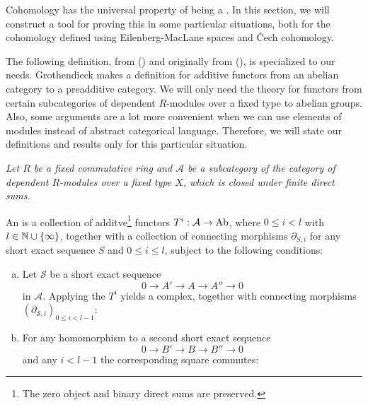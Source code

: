 Cohomology has the universal property of being a .
In this section, we will construct a tool for proving this in some particular situations,
both for the cohomology defined using Eilenberg-MacLane spaces and \v{C}ech cohomology.

The following definition, from (\cite[2.1]{tohoku-translation}) and originally from (\cite{tohoku1957}), is specialized to our needs.
Grothendieck makes a definition for additive functors from an abelian category to a preadditive category.
We will only need the theory for functors from certain subcategories of dependent $R$-modules over a fixed type to abelian groups.
Also, some arguments are a lot more convenient when we can use elements of modules instead of abstract categorical language.
Therefore, we will state our definitions and results only for this particular situation.

\emph{Let $R$ be a fixed commutative ring and $\mathcal A$ be a subcategory of the category of dependent $R$-modules over a fixed type $X$, which is closed under finite direct sums.}

\begin{definition}
  An  is a collection of additve\footnote{
    The zero object and binary direct sums are preserved.
  }
  functors
  $T^i:\mathcal A\to \operatorname{Ab}$, where $0\leq i < l$ with $l\in\mathbb{N}\cup\{\infty\}$,
  together with a collection of connecting morphisms $\partial_{S,i}$ for any short exact sequence $S$ and $0\leq i\le l$, subject to the following conditions:
  \begin{enumerate}[(a)]
  \item Let $\mathcal{S}$ be a short exact sequence
    \[ 0\to A'\to A\to A''\to 0\]
    in $\mathcal A$. Applying the $T^i$ yields a complex, together with connecting morphisms $(\partial_{\mathcal{S},i})_{0\leq i<l-1}$:
    \begin{center}
    \end{center}
  \item For any homomorphism to a second short exact sequence
    \[ 0\to B'\to B\to B''\to 0\]
    and any $i<l-1$ the corresponding square commutes:
    \begin{center}
    \end{center}
  \end{enumerate}
\end{definition}

